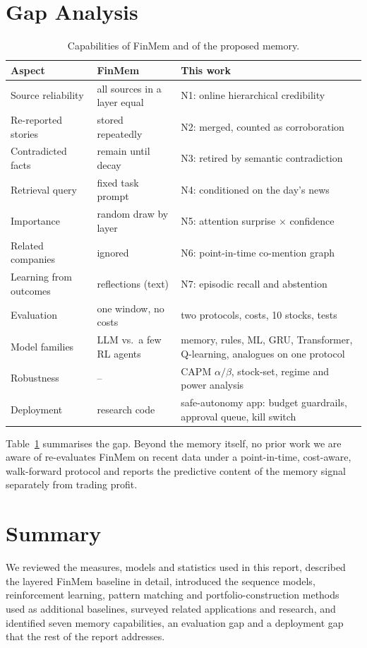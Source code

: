 \section{Gap Analysis}
\begin{table}[ht]
\centering
\caption{Capabilities of FinMem and of the proposed memory.}
\label{tab:gap}
\small
\begin{tabular}{p{}p{}p{}}
\hline
Aspect & FinMem & This work \\
\hline
Source reliability & all sources in a layer equal & N1: online hierarchical credibility \\
Re-reported stories & stored repeatedly & N2: merged, counted as corroboration \\
Contradicted facts & remain until decay & N3: retired by semantic contradiction \\
Retrieval query & fixed task prompt & N4: conditioned on the day's news \\
Importance & random draw by layer & N5: attention surprise $\times$ confidence \\
Related companies & ignored & N6: point-in-time co-mention graph \\
Learning from outcomes & reflections (text) & N7: episodic recall and abstention \\
Evaluation & one window, no costs & two protocols, costs, 10 stocks, tests \\
Model families & LLM vs.\ a few RL agents & memory, rules, ML, GRU, Transformer, Q-learning, analogues on one protocol \\
Robustness & -- & CAPM $\alpha/\beta$, stock-set, regime and power analysis \\
Deployment & research code & safe-autonomy app: budget guardrails, approval queue, kill switch \\
\hline
\end{tabular}
\end{table}
Table~\ref{tab:gap} summarises the gap. Beyond the memory itself, no prior work we are aware of re-evaluates FinMem on recent data under a point-in-time, cost-aware, walk-forward protocol and reports the predictive content of the memory signal separately from trading profit.

\section{Summary}
We reviewed the measures, models and statistics used in this report, described the layered FinMem baseline in detail, introduced the sequence models, reinforcement learning, pattern matching and portfolio-construction methods used as additional baselines, surveyed related applications and research, and identified seven memory capabilities, an evaluation gap and a deployment gap that the rest of the report addresses.
